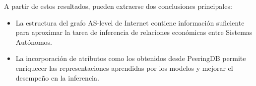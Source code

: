 A partir de estos resultados, pueden extraerse dos conclusiones principales:

\begin{itemize}
    \item La estructura del grafo AS-level de Internet contiene información suficiente para aproximar la tarea de inferencia de relaciones económicas entre Sistemas Autónomos.
    \item La incorporación de atributos como los obtenidos desde PeeringDB permite enriquecer las representaciones aprendidas por los modelos y mejorar el desempeño en la inferencia.
\end{itemize}










